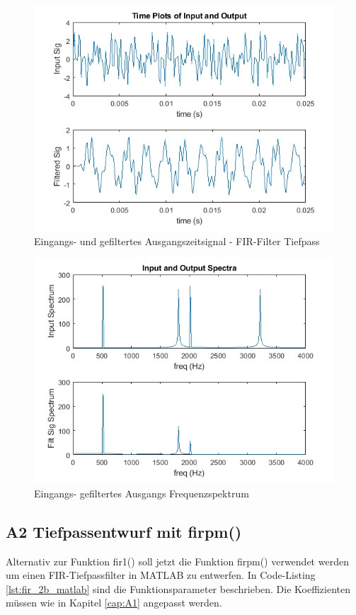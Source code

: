 \newpage

\begin{figure}[H]
	\centering
	\includegraphics[width=0.8\linewidth]{Bilder/Attachment_A1_fir_2a_Timeplot}
	\caption{Eingangs- und gefiltertes Ausgangszeitsignal  - FIR-Filter Tiefpass}
	\label{fig:Attachment_A1_fir_2a_Timeplot}
\end{figure}

\begin{figure}[H]
	\centering
	\includegraphics[width=0.8\linewidth]{Bilder/Attachment_A1_fir_2a_Spektrum}
	\caption{Eingangs- gefiltertes Ausgangs Frequenzspektrum}
	\label{fig:Attachment_A1_fir_2a_Spektrum}
\end{figure}

\newpage
\subsection{A2 Tiefpassentwurf mit firpm()}


\noindent Alternativ zur Funktion fir1() soll jetzt die Funktion firpm() verwendet werden um einen FIR-Tiefpassfilter in MATLAB zu entwerfen. In Code-Listing \ref{lst:fir_2b_matlab} sind die Funktionsparameter beschrieben. Die Koeffizienten müssen wie in Kapitel \ref{cap:A1} angepasst werden.

